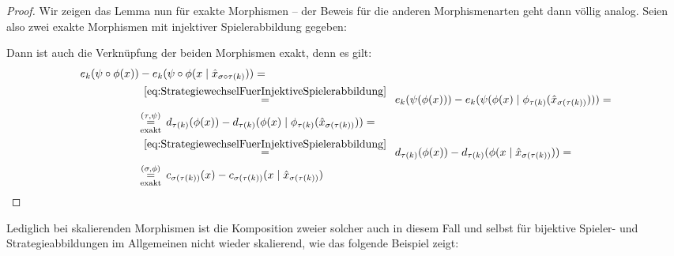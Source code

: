 \begin{proof}
	Wir zeigen das Lemma nun für exakte Morphismen -- der Beweis für die anderen Morphismenarten geht dann völlig analog. Seien also zwei exakte Morphismen mit injektiver Spielerabbildung gegeben:
		\begin{center}\end{center}
	Dann ist auch die Verknüpfung der beiden Morphismen exakt, denn es gilt:
		\begin{align*}
			e_k(\psi\circ\phi(x)) &- e_k(\psi\circ\phi(x \mid \hat{x}_{\sigma\circ\tau(k)})) = \\
				&\,\overset{\eqref{eq:StrategiewechselFuerInjektiveSpielerabbildung}}{=}\,\,\,
					e_k(\psi(\phi(x))) - e_k(\psi(\phi(x) \mid \phi_{\tau(k)}(\hat{x}_{\sigma(\tau(k))}))) = \\
				&\!\underset{\text{exakt}}{\overset{(\tau, \psi)}{=}}\,
					d_{\tau(k)}(\phi(x)) - d_{\tau(k)}(\phi(x) \mid \phi_{\tau(k)}(\hat{x}_{\sigma(\tau(k))})) = \\
				&\,\overset{\eqref{eq:StrategiewechselFuerInjektiveSpielerabbildung}}{=}\,\,\, 
					d_{\tau(k)}(\phi(x)) - d_{\tau(k)}(\phi(x \mid \hat{x}_{\sigma(\tau(k))})) = \\
				&\!\underset{\text{exakt}}{\overset{(\sigma, \phi)}{=}}\, 
					c_{\sigma(\tau(k))}(x) - c_{\sigma(\tau(k))}(x \mid \hat{x}_{\sigma(\tau(k))})
				\qedhere
		\end{align*}
\end{proof}

Lediglich bei skalierenden Morphismen ist die Komposition zweier solcher auch in diesem Fall und selbst für bijektive Spieler- und Strategieabbildungen im Allgemeinen nicht wieder skalierend, wie das folgende Beispiel zeigt:

